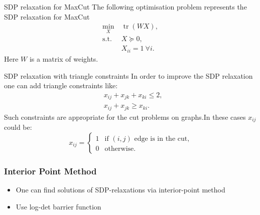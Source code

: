 \documentclass[10pt]{beamer}
\DeclareMathOperator{\tr}{tr}
\begin{document}
	\begin{frame}{SDP relaxation for MaxCut}
	    The following optimisation problem represents the SDP relaxation for MaxCut
	    \begin{align*}
	        \min_X &~ \tr(WX),\\
	        \text{s.t.} &~ X \succeq 0,\\
	        &~ X_{ii} = 1 ~\forall i.
	    \end{align*}
	    Here $W$ is a matrix of weights.
	    
	    
	\end{frame}
        
        \begin{frame}{SDP relaxation with triangle constraints}
            In order to improve the SDP relaxation one can add triangle constraints like:
            \begin{align*}
                &x_{ij} + x_{jk} + x_{ki} \leq 2, \\
                &x_{ij} + x_{jk} \geq x_{ki}.
            \end{align*}
            Such constraints are appropriate for the cut problems on graphs.In these cases $x_{ij}$ could be:
            \[
                x_{ij} = \begin{cases} 1 & \text{if } (i, j) \text{ edge is in the cut,} \\ 
                0 & \text{otherwise.}\end{cases}
            \]
            
        \end{frame}

	\begin{frame}
		\frametitle{Interior Point Method}
		
		\begin{itemize}
			\item One can find solutions of SDP-relaxations via interior-point method
			\item Use log-det barrier function
		\end{itemize}
		
	\end{frame}
	
\end{document}
